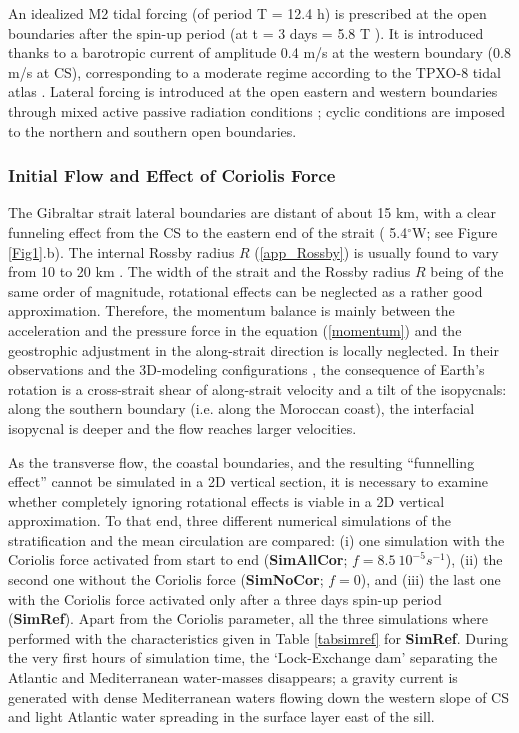 An idealized M2 tidal forcing (of period T = 12.4 h) is prescribed at the open boundaries after the spin-up period (at t = 3 days = 5.8 T ). It is introduced thanks to a barotropic current of amplitude 0.4 m/s at the western boundary (0.8 m/s at CS), corresponding to a moderate regime according to the TPXO-8 tidal atlas \citep{tpxo8}. Lateral forcing is introduced at the open eastern and western boundaries through mixed active passive radiation conditions  \citep{Marchesiello2001} ; cyclic conditions are imposed to the northern and southern open boundaries.

\subsubsection{Initial Flow and Effect of Coriolis Force}
\label{Coriolis}

The Gibraltar strait lateral boundaries  are distant of about 15 km, with a clear funneling effect from the CS to the eastern end of the strait ( 5.4$^\circ$W; see Figure \ref{Fig1}.b). The internal Rossby radius $R$ (\ref{app_Rossby}) is usually found to vary from 10 to 20 km \citep{Bormans1989, CW90, Vlasenko2009}. The width of the strait and the Rossby radius $R$ being of the same order of magnitude, rotational effects can be neglected as a rather good approximation. Therefore, the momentum balance is mainly between the acceleration and the pressure force in the equation (\ref{momentum}) and the geostrophic adjustment in the along-strait direction is locally neglected. In their observations \citep{FA1988} and the 3D-modeling configurations \citep{Sannino2002}, the consequence of Earth's rotation is a cross-strait shear of along-strait velocity \citep{Bormans1989} and a tilt of the isopycnals: along the southern boundary  (i.e. along the Moroccan coast), the interfacial isopycnal is deeper and the flow reaches larger velocities.

As the transverse flow, the coastal boundaries, and the resulting ``funnelling effect'' cannot be simulated in a 2D vertical section, it is necessary to examine whether completely ignoring rotational effects is viable in a 2D vertical approximation. To that end, three different numerical simulations of the stratification and the mean circulation are compared: (i) one simulation with the Coriolis force activated from start to end (\textbf{SimAllCor}; $f = 8.5 \ 10^{-5} s^{-1}$), (ii) the second one without the Coriolis force (\textbf{SimNoCor}; $f=0$), and (iii) the last one with the Coriolis force activated only after a three days spin-up period (\textbf{SimRef}). Apart from the Coriolis parameter, all the three simulations where performed with the characteristics given in Table \ref{tabsimref} for \textbf{SimRef}. During the very first hours of simulation time, the `Lock-Exchange dam' separating the Atlantic and Mediterranean water-masses disappears; a gravity current is generated with dense Mediterranean waters flowing down the western slope of CS and light Atlantic water spreading in the surface layer east of the sill.

